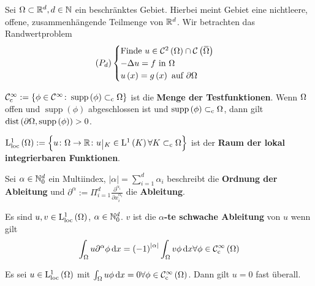 Sei $\Omega \subset\mathbb{R}^{d},d\in\mathbb{N}$ ein beschränktes Gebiet. Hierbei meint Gebiet eine nichtleere, offene, zusammenhängende Teilmenge von $\mathbb{R}^{d}$. Wir betrachten das Randwertproblem
\begin{equation*}
	\left(P_{d}\right)\begin{cases}
		\text{Finde } u\in\C^{2}\left(\W\right) \cap \C\left(\overbar{\W}\right)\\
		-\Delta u = f \text{ in }\W\\
		u\left(x\right) = g\left(x\right) \text{ auf }\partial\W
	\end{cases}
\end{equation*}

\begin{definition}
	$\mathcal{C}^{\infty}_{\text{c}}:=\left\{\phi\in\mathcal{C}^{\infty}\colon\operatorname{supp}\left(\phi\right)\subset_{\text{c}}\Omega\right\}$ ist die \textbf{Menge der Testfunktionen}. Wenn $\Omega$ offen und $\operatorname{supp}\left(\phi\right)$ abgeschlossen ist und $\operatorname{supp}\left(\phi\right)\subset_{\text{c}}\Omega$, dann gilt $\operatorname{dist}\left(\partial\Omega,\operatorname{supp}\left(\phi\right)\right)>0$.{}
	
	$\L^{1}_{\text{loc}}\left(\W\right) := \left\{u\colon\W\to\R\colon u\einschraenkung_{K}\in\L^{1}\left(K\right)\forall K\subset_{\text{c}}\W\right\}$ ist der \textbf{Raum der lokal integrierbaren Funktionen}.
	
	Sei $\alpha\in\mathbb{N}_{0}^{d}$ ein Multiindex, $|\alpha|=\sum_{i=1}^{d}\alpha_{i}$ beschreibt die \textbf{Ordnung der Ableitung} und $\partial^{\alpha}:=\Pi_{i=1}^{d}\frac{\partial^{\alpha_{i}}}{\partial x_{i}^{\alpha_{i}}}$ die \textbf{Ableitung}.
\end{definition}

\begin{definition}
	Es sind $u,v\in\mathrm{L}^{1}_{\text{loc}}\left(\Omega\right)$, $\alpha\in\mathbb{N}_{0}^{d}$. $v$ ist die \textbf{$\alpha$-te schwache Ableitung} von $u$ wenn gilt
	\begin{equation*}
		\int_{\Omega}u\partial^{\alpha}\phi\,\mathrm{d} x = \left(-1\right)^{|\alpha|}\int_{\Omega}v\phi\,\mathrm{d} x \forall \phi\in\mathcal{C}^{\infty}_{\text{c}}\left(\Omega\right)
	\end{equation*}
\end{definition}

\begin{lemma}
	Es sei $u\in\mathrm{L}^{1}_{\text{loc}}\left(\Omega\right)$ mit $\int_{\Omega} u\phi\,\mathrm{d} x = 0 \forall\phi\in\mathcal{C}^{\infty}_{\text{c}}\left(\Omega\right)$. Dann gilt $u=0$ fast überall.
\end{lemma}

